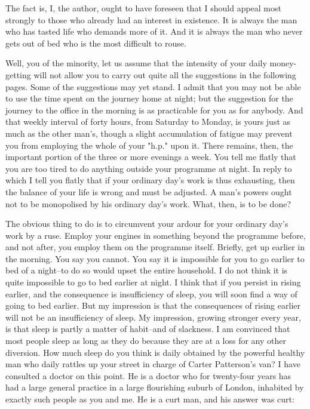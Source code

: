The fact is, I, the author, ought to have foreseen that I should appeal
most strongly to those who already had an interest in existence.  It is
always the man who has tasted life who demands more of it.  And it is
always the man who never gets out of bed who is the most difficult to
rouse.

Well, you of the minority, let us assume that the intensity of your
daily money-getting will not allow you to carry out quite all the
suggestions in the following pages.  Some of the suggestions may yet
stand.  I admit that you may not be able to use the time spent on the
journey home at night; but the suggestion for the journey to the office
in the morning is as practicable for you as for anybody. And that
weekly interval of forty hours, from Saturday to Monday, is yours just
as much as the other man's, though a slight accumulation of fatigue may
prevent you from employing the whole of your "h.p." upon it.  There
remains, then, the important portion of the three or more evenings a
week.  You tell me flatly that you are too tired to do anything outside
your programme at night.  In reply to which I tell you flatly that if
your ordinary day's work is thus exhausting, then the balance of your
life is wrong and must be adjusted.  A man's powers ought not to be
monopolised by his ordinary day's work. What, then, is to be done?

The obvious thing to do is to circumvent your ardour for your ordinary
day's work by a ruse. Employ your engines in something beyond the
programme before, and not after, you employ them on the programme
itself.  Briefly, get up earlier in the morning.  You say you cannot.
You say it is impossible for you to go earlier to bed of a night--to do
so would upset the entire household.  I do not think it is quite
impossible to go to bed earlier at night.  I think that if you persist
in rising earlier, and the consequence is insufficiency of sleep, you
will soon find a way of going to bed earlier.  But my impression is
that the consequences of rising earlier will not be an insufficiency of
sleep.  My impression, growing stronger every year, is that sleep is
partly a matter of habit--and of slackness.  I am convinced that most
people sleep as long as they do because they are at a loss for any
other diversion. How much sleep do you think is daily obtained by the
powerful healthy man who daily rattles up your street in charge of
Carter Patterson's van?  I have consulted a doctor on this point.  He
is a doctor who for twenty-four years has had a large general practice
in a large flourishing suburb of London, inhabited by exactly such
people as you and me.  He is a curt man, and his answer was curt:

